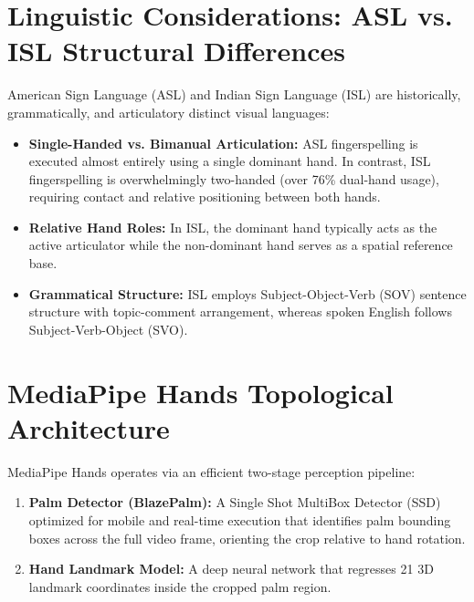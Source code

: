 \section{Linguistic Considerations: ASL vs. ISL Structural Differences}
American Sign Language (ASL) and Indian Sign Language (ISL) are historically, grammatically, and articulatory distinct visual languages:
\begin{itemize}
\item \textbf{Single-Handed vs. Bimanual Articulation:} ASL fingerspelling is executed almost entirely using a single dominant hand. In contrast, ISL fingerspelling is overwhelmingly two-handed (over 76\% dual-hand usage), requiring contact and relative positioning between both hands.
\item \textbf{Relative Hand Roles:} In ISL, the dominant hand typically acts as the active articulator while the non-dominant hand serves as a spatial reference base.
\item \textbf{Grammatical Structure:} ISL employs Subject-Object-Verb (SOV) sentence structure with topic-comment arrangement, whereas spoken English follows Subject-Verb-Object (SVO).
\end{itemize}


\section{MediaPipe Hands Topological Architecture}
MediaPipe Hands operates via an efficient two-stage perception pipeline:
\begin{enumerate}
\item \textbf{Palm Detector (BlazePalm):} A Single Shot MultiBox Detector (SSD) optimized for mobile and real-time execution that identifies palm bounding boxes across the full video frame, orienting the crop relative to hand rotation.
\item \textbf{Hand Landmark Model:} A deep neural network that regresses 21 3D landmark coordinates inside the cropped palm region.
\end{enumerate}


